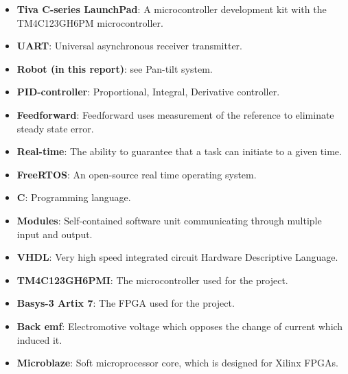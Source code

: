\documentclass[../../main.tex]{subfiles}
\begin{document}
\begin{itemize}
    \item \textbf{Tiva C-series LaunchPad}: A microcontroller development kit with the TM4C123GH6PM microcontroller.
    
    
    \item \textbf{UART}: Universal asynchronous receiver transmitter.
    \item \textbf{Robot (in this report)}: see Pan-tilt system.
    
    \item \textbf{PID-controller}: Proportional, Integral, Derivative controller.
    \item \textbf{Feedforward}: Feedforward uses measurement of the reference to eliminate steady state error.
    \item \textbf{Real-time}: The ability to guarantee that a task can initiate to a given time.
    \item \textbf{FreeRTOS}: An open-source real time operating system.
    \item \textbf{C}: Programming language. 
    \item \textbf{Modules}: Self-contained software unit communicating through multiple input and output.
    \item \textbf{VHDL}: Very high speed integrated circuit Hardware Descriptive Language.
    
    \item \textbf{TM4C123GH6PMI}: The microcontroller used for the project.
    \item \textbf{Basys-3 Artix 7}: The FPGA used for the project.
    \item \textbf{Back emf}: Electromotive voltage which opposes the change of current which induced it. 
    \item \textbf{Microblaze}: Soft microprocessor core, which is designed for Xilinx FPGAs.
\end{itemize}
\end{document}

